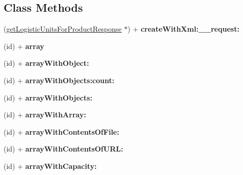 \subsection*{Class Methods}
\begin{DoxyCompactItemize}
\item 
\hypertarget{interfaceget_logistic_units_for_product_response_a05070830cb1023193861d86e78654ad8}{}(\hyperlink{interfaceget_logistic_units_for_product_response}{get\+Logistic\+Units\+For\+Product\+Response} $\ast$) + {\bfseries create\+With\+Xml\+:\+\_\+\+\_\+request\+:}\label{interfaceget_logistic_units_for_product_response_a05070830cb1023193861d86e78654ad8}

\item 
\hypertarget{interfaceget_logistic_units_for_product_response_a420d62d0d7855ba2e23ea370bc97cb6d}{}(id) + {\bfseries array}\label{interfaceget_logistic_units_for_product_response_a420d62d0d7855ba2e23ea370bc97cb6d}

\item 
\hypertarget{interfaceget_logistic_units_for_product_response_a65c363e19805c7a88f400ba1b884ce43}{}(id) + {\bfseries array\+With\+Object\+:}\label{interfaceget_logistic_units_for_product_response_a65c363e19805c7a88f400ba1b884ce43}

\item 
\hypertarget{interfaceget_logistic_units_for_product_response_a640a399adfd657bee71ae6131af4503f}{}(id) + {\bfseries array\+With\+Objects\+:count\+:}\label{interfaceget_logistic_units_for_product_response_a640a399adfd657bee71ae6131af4503f}

\item 
\hypertarget{interfaceget_logistic_units_for_product_response_a9f3824ba52a74ace182e1bea71c292fd}{}(id) + {\bfseries array\+With\+Objects\+:}\label{interfaceget_logistic_units_for_product_response_a9f3824ba52a74ace182e1bea71c292fd}

\item 
\hypertarget{interfaceget_logistic_units_for_product_response_a9680e02b92e3799d826170b975a3d9b6}{}(id) + {\bfseries array\+With\+Array\+:}\label{interfaceget_logistic_units_for_product_response_a9680e02b92e3799d826170b975a3d9b6}

\item 
\hypertarget{interfaceget_logistic_units_for_product_response_a40af88a3bd97c38cfa58f3f1fca373ae}{}(id) + {\bfseries array\+With\+Contents\+Of\+File\+:}\label{interfaceget_logistic_units_for_product_response_a40af88a3bd97c38cfa58f3f1fca373ae}

\item 
\hypertarget{interfaceget_logistic_units_for_product_response_ad2c79933784763f53ff7e1e0843be15c}{}(id) + {\bfseries array\+With\+Contents\+Of\+U\+R\+L\+:}\label{interfaceget_logistic_units_for_product_response_ad2c79933784763f53ff7e1e0843be15c}

\item 
\hypertarget{interfaceget_logistic_units_for_product_response_a0d321b6cc41c5f96a776876a1be559f3}{}(id) + {\bfseries array\+With\+Capacity\+:}\label{interfaceget_logistic_units_for_product_response_a0d321b6cc41c5f96a776876a1be559f3}

\end{DoxyCompactItemize}
